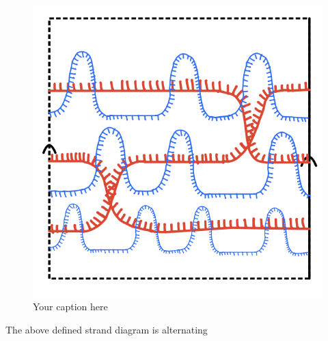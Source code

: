 \begin{figure}[H] 
    \centering
    \includegraphics[scale = 0.95]{diagrams/natural_alternating_diagrams/10.png} 
    \caption{Your caption here}
    \label{fig:your-label}
\end{figure}

\begin{theorem}
The above defined strand diagram is alternating
\end{theorem}

